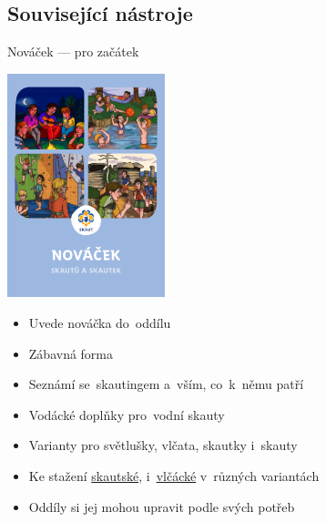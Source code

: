 \documentclass[compress, ucs, xelatex, 11pt, xcolor=dvipsnames, print, aspectratio=169,
	hyperref={
		bookmarks=true,
		unicode=true,
		colorlinks=true,
		pdftitle={Skautska vychovna metoda},
		plainpages=false,
		pdfauthor={Vojtech Zeisek},
		pdfsubject={Skautska vychovna metoda a jeji vyvoj za posledni stoleti a desetileti},
		pdfcreator={XeLaTeX},
		pdfkeywords={Junak, Pedagogika, Skaut, Skauting, Vychovna metoda},
		linkcolor=Red, %
		anchorcolor=ForestGreen, %
		citecolor=ForestGreen, %
		filecolor=ForestGreen, %
		menucolor=ForestGreen, %
		urlcolor=Sepia, %
		pdftex},
	url={hyphens, lowtilde} %
	]{beamer}
\begin{document}
\subsection{Související nástroje}

\begin{frame}{Nováček --- pro začátek}
	\begin{multicols}{2}
		\includegraphics[height=6.5cm]{novacek.png}
		\columnbreak
		\begin{itemize}
			\item Uvede nováčka do~oddílu
			\item Zábavná forma
			\item Seznámí se~skautingem a~vším, co~k~němu patří
			\item Vodácké doplňky pro~vodní skauty
			\item Varianty pro světlušky, vlčata, skautky i~skauty
			\item Ke stažení \href{https://stezka.skaut.cz/novacek/}{skautské}, i~\href{https://krizovatka.skaut.cz/svetlusky-zabicky-vlcata/stezky-a-cesticky-vlcat-svetlusek-a-zabicek/2021-03/novacek-vlcat-svetlusek-a-zabicek}{vlčácké} v~různých variantách
			\item Oddíly si jej mohou upravit podle svých potřeb
		\end{itemize}
	\end{multicols}
\end{frame}
\end{document}
